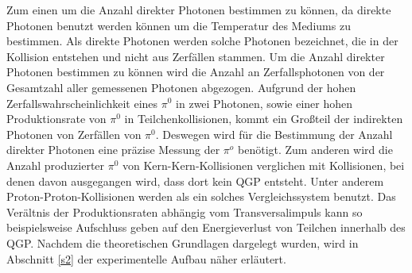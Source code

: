 \newline
Zum einen um die Anzahl direkter Photonen bestimmen zu k\"onnen, da direkte Photonen benutzt werden k\"onnen um die Temperatur des Mediums zu bestimmen.
Als direkte Photonen werden solche Photonen bezeichnet, die in der Kollision entstehen und nicht aus Zerf\"allen stammen.
Um die Anzahl direkter Photonen bestimmen zu k\"onnen wird die Anzahl an Zerfallsphotonen von der Gesamtzahl aller gemessenen Photonen abgezogen.
Aufgrund der hohen Zerfallswahrscheinlichkeit eines $\pi^{0}$ in zwei Photonen, sowie einer hohen Produktionsrate von $\pi^{0}$ in Teilchenkollisionen, kommt ein Gro{\ss}teil der indirekten Photonen von Zerf\"allen von $\pi^{0}$.
Deswegen wird f\"ur die Bestimmung der Anzahl direkter Photonen eine pr\"azise Messung der $\pi^{o}$ ben\"otigt.
\newline
Zum anderen wird die Anzahl produzierter $\pi^{0}$ von Kern-Kern-Kollisionen verglichen mit Kollisionen, bei denen davon ausgegangen wird, dass dort kein QGP entsteht.
Unter anderem Proton-Proton-Kollisionen werden als ein solches Vergleichssystem benutzt.
Das Ver\"altnis der Produktionsraten abh\"angig vom Transversalimpuls kann so beispielsweise Aufschluss geben auf den Energieverlust von Teilchen innerhalb des QGP.
\newline
Nachdem die theoretischen Grundlagen dargelegt wurden, wird in Abschnitt \ref{s2} der experimentelle Aufbau n\"aher erl\"autert.